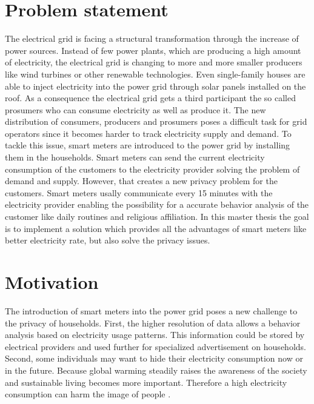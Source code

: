\documentclass[english,sigconf,11pt]{acmart}
\begin{document}


\def\@copyrightspace{\relax}

\maketitle

\section{Problem statement}
The electrical grid is facing a structural transformation through the increase of power sources. Instead of few power plants, which are producing a high amount of electricity, the electrical grid is changing to more and more smaller producers like wind turbines or other renewable technologies. Even single-family houses are able to inject electricity into the power grid through solar panels installed on the roof. As a consequence the electrical grid gets a third participant the so called prosumers who can consume electricity as well as produce it. The new distribution of consumers, producers and prosumers poses a difficult task for grid operators since it becomes harder to track electricity supply and demand. To tackle this issue, smart meters are introduced to the power grid by installing them in the households. Smart meters can send the current electricity consumption of the customers to the electricity provider solving the problem of demand and supply. However, that creates a new privacy problem for the customers. Smart meters usally communicate every 15 minutes with the electricity provider enabling the possibility for a accurate behavior analysis of the customer like daily routines and religious affiliation. In this master thesis the goal is to implement a solution which provides all the advantages of smart meters like better electricity rate, but also solve the privacy issues.
\section{Motivation}
The introduction of smart meters into the power grid poses a new challenge to the privacy of households. First, the higher resolution of data allows a behavior analysis based on electricity usage patterns. This information could be stored by electrical providers and used further for specialized advertisement on households. Second, some individuals may want to hide their electricity consumption now or in the future. Because global warming steadily raises the awareness of the society and sustainable living becomes more important. Therefore a high electricity consumption can harm the image of people \cite{spiegel}.
\end{document}
